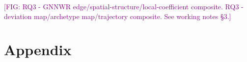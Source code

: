 \documentclass[logo,msc,ai]{infthesis}           %
\newcommand{\fig}[1]{\textcolor{purple}{[FIG: #1]}}
\begin{document}
\fig{RQ3 - GNNWR edge/spatial-structure/local-coefficient composite. RQ3 - deviation map/archetype map/trajectory composite. See working notes \S3.}



























\appendix
\chapter{Appendix}  \label{chap:appendix} 



\end{document}
